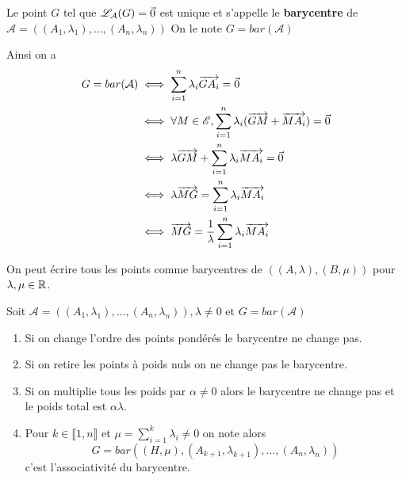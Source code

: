 \documentclass[a4paper,12pt]{article}
\begin{document}
\begin{definition}
    Le point $G$ tel que $\mathscr{L}_\mathcal{A}(G) = \vec{0}$ est unique et s'appelle le \textbf{barycentre} de $\mathcal{A} = ((A_1, \lambda_1), \ldots, (A_n, \lambda_n))$
    On le note $G = bar(\mathcal{A})$
\end{definition}

Ainsi on a
\begin{align*}
    G = bar(\mathcal{A}) &\iff \sum_{i=1}^n \lambda_i \overrightarrow{G A_i} = \vec{0} \\
    &\iff \forall M \in \mathscr{E}, \sum_{i=1}^n \lambda_i (\overrightarrow{G M} + \overrightarrow{M A_i}) = \vec{0} \\
    &\iff \lambda \overrightarrow{G M} + \sum_{i=1}^n \lambda_i \overrightarrow{M A_i} = \vec{0} \\
    &\iff \lambda \overrightarrow{M G} = \sum_{i=1}^n \lambda_i \overrightarrow{M A_i} \\
    &\iff \overrightarrow{MG} = \frac{1}{\lambda} \sum_{i=1}^n \lambda_i \overrightarrow{MA_i}
\end{align*}

\begin{remarque}
    On peut écrire tous les points comme barycentres de $((A, \lambda), (B, \mu))$ pour $\lambda, \mu \in \mathbb{R}$.
\end{remarque}

\begin{proposition}{}{}
    Soit $\mathcal{A} = ((A_1, \lambda_1), \ldots, (A_n, \lambda_n)), \lambda \neq 0$
    et $G = bar(\mathcal{A})$
    \begin{enumerate}[label=\roman*.]
        \item Si on change l'ordre des points pondérés le barycentre ne change pas.
        \item Si on retire les points à poids nuls on ne change pas le barycentre.
        \item Si on multiplie tous les poids par $\alpha \neq 0$ alors le barycentre ne change pas et le poids total est $\alpha \lambda$.
        \item Pour $k \in \llbracket 1, n \rrbracket$ et $\mu = \sum_{i=1}^k \lambda_i \neq 0$ on note  alors
        $$
        G = bar((H, \mu), (A_{k+1}, \lambda_{k+1}), \ldots, (A_n, \lambda_n))
        $$
        c'est l'associativité du barycentre.
    \end{enumerate}
\end{proposition}
\end{document}
